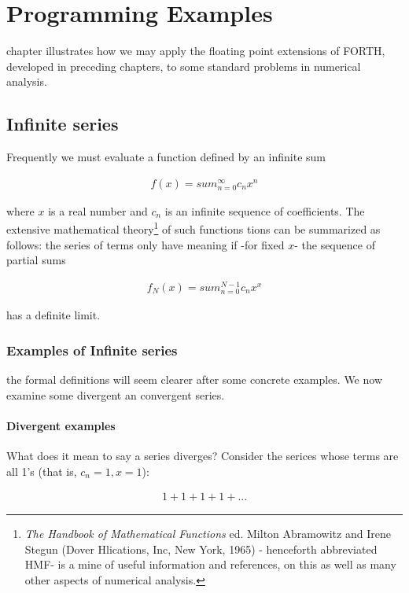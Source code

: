 \chapter{Programming Examples}
\startcontents[chapters]

 chapter illustrates how we may apply the floating point extensions of FORTH, developed in preceding chapters, to some standard problems in numerical analysis.

\section{Infinite series}

Frequently we must evaluate a function defined by an infinite sum

\begin{align}
    f(x) = sum_{n=0}^{\infty}c_{n}x^{n}
\end{align}

where $x$ is a real number and $c_n$ is an infinite sequence of coefficients. The extensive mathematical theory\footnote{\textit{The Handbook of Mathematical Functions} ed. Milton Abramowitz and Irene Stegun (Dover Hlications, Inc, New York, 1965) - henceforth abbreviated HMF- is a mine of useful information and references, on this as well as many other aspects of numerical analysis.} of such functions tions can be summarized as follows: the series of terms only have meaning if -for fixed $x$- the sequence of partial sums

\begin{align}
    f_{N}(x) = sum_{n=0}^{N-1}c_{n}x^{x}
\end{align}

has a definite limit.

\subsection{Examples of Infinite series}
 the formal definitions will seem clearer after some concrete examples. We now examine some divergent an convergent series.

\subsubsection{Divergent examples}
What does it mean to say a series diverges? Consider the serices whose terms are all 1's (that is, $c_n = 1, x = 1$):

\begin{align}
    1 + 1 + 1 + 1 + ...
\end{align}


